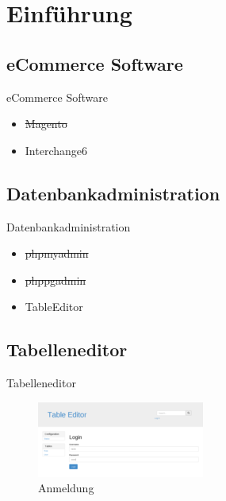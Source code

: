
\section{Einführung}


\subsection{eCommerce Software}
\begin{frame}{eCommerce Software}
\begin{itemize}
\item \sout{Magento}
\item Interchange6
\end{itemize}
\end{frame}

\subsection{Datenbankadministration}
\begin{frame}{Datenbankadministration}
\begin{itemize}
\item \sout{phpmyadmin}
\item \sout{phppgadmin}
\item TableEditor
\end{itemize}
\end{frame}

\subsection{Tabelleneditor}
\begin{frame}{Tabelleneditor}
\begin{figure}
\includegraphics{images/te-login.png}
\caption{Anmeldung}
\end{figure}
\end{frame}

